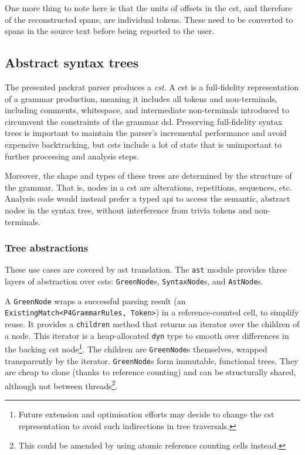 One more thing to note here is that the units of offsets in the \acrshort{cst},
and therefore of the reconstructed spans, are individual tokens. These need to
be converted to spans in the source text before being reported to the user.

\subsection{Abstract syntax trees}

The presented packrat parser produces a \emph{\acrfull{cst}}. A \acrlong{cst} is
a full-fidelity representation of a grammar production, meaning it includes all
tokens and non-terminals, including comments, whitespace, and intermediate
non-terminals introduced to circumvent the constraints of the grammar
\acrshort{dsl}. Preserving full-fidelity syntax trees is important to maintain
the parser's incremental performance and avoid expensive backtracking, but
\acrshort{cst}s include a lot of state that is unimportant to further processing
and analysis steps.

Moreover, the shape and types of these trees are determined by the structure of
the grammar. That is, nodes in a \acrshort{cst} are alterations, repetitions,
sequences, etc. Analysis code would instead prefer a typed \acrshort{api} to
access the semantic, abstract nodes in the syntax tree, without interference
from trivia tokens and non-terminals.

\subsubsection*{Tree abstractions}

These use cases are covered by \acrshort{ast} translation. The \texttt{ast}
module provides three layers of abstraction over \acrshort{cst}s:
\texttt{GreenNode}s, \texttt{SyntaxNode}s, and \texttt{AstNode}s.

A \texttt{GreenNode} wraps a successful parsing result (an
\texttt{ExistingMatch<P4GrammarRules, Token>}) in a reference-counted cell, to
simplify reuse. It provides a \texttt{children} method that returns an iterator
over the children of a node. This iterator is a heap-allocated \texttt{dyn} type
to smooth over differences in the backing \acrshort{cst} node\footnote{Future
extension and optimisation efforts may decide to change the \acrshort{cst}
representation to avoid such indirections in tree traversals.}. The children are
\texttt{GreenNode}s themselves, wrapped transparently by the iterator.
\texttt{GreenNode}s form immutable, functional trees. They are cheap to clone
(thanks to reference counting) and can be structurally shared, although not
between threads\footnote{This could be amended by using atomic reference
counting cells instead.}.

